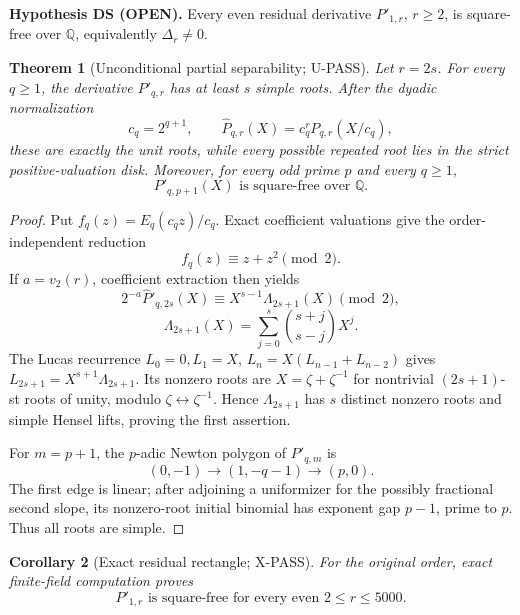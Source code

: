 \documentclass[11pt]{article}
\theoremstyle{keio}
\newtheorem{theorem}{Theorem}[section]
\newtheorem{corollary}[theorem]{Corollary}
\theoremstyle{definition}
\theoremstyle{remark}
\newcommand{\Q}{\mathbb Q}
\newcommand{\UPASS}{\textcolor{keiogreen}{\textsf{U-PASS}}}
\newcommand{\XPASS}{\textcolor{keioxblue}{\textsf{X-PASS}}}
\newcommand{\OPEN}{\textcolor{keioopen}{\textsf{OPEN}}}
\begin{document}
\begin{notebox}
\textbf{Hypothesis DS (\OPEN).} Every even residual derivative
$P'_{1,r}$, $r\ge2$, is square-free over $\Q$, equivalently
$\Delta_r\ne0$.
\end{notebox}

\begin{theorem}[Unconditional partial separability; \UPASS]\label{thm:partial-sep}
Let $r=2s$. For every $q\ge1$, the derivative $P'_{q,r}$ has at least
$s$ simple roots. After the dyadic normalization
\[
c_q=2^{q+1},\qquad
\widehat P_{q,r}(X)=c_q^rP_{q,r}(X/c_q),
\]
these are exactly the unit roots, while every possible repeated root lies
in the strict positive-valuation disk. Moreover, for every odd prime $p$
and every $q\ge1$,
\begin{equation}
\boxed{P'_{q,p+1}(X)\text{ is square-free over }\Q.}
\label{eq:prime-successor}
\end{equation}
\end{theorem}

\begin{proof}
Put $f_q(z)=E_q(c_qz)/c_q$. Exact coefficient valuations give the
order-independent reduction
\[
f_q(z)\equiv z+z^2\pmod2.
\]
If $a=v_2(r)$, coefficient extraction then yields
\begin{equation}
2^{-a}\widehat P'_{q,2s}(X)\equiv
X^{s-1}\Lambda_{2s+1}(X)\pmod2,
\label{eq:lambda-reduction}
\end{equation}
\begin{equation}
\Lambda_{2s+1}(X)=
\sum_{j=0}^s\binom{s+j}{s-j}X^j.
\label{eq:lambda}
\end{equation}
The Lucas recurrence $L_0=0,L_1=X$,
$L_n=X(L_{n-1}+L_{n-2})$ gives
$L_{2s+1}=X^{s+1}\Lambda_{2s+1}$. Its nonzero roots are
$X=\zeta+\zeta^{-1}$ for nontrivial $(2s+1)$-st roots of unity, modulo
$\zeta\leftrightarrow\zeta^{-1}$. Hence $\Lambda_{2s+1}$ has $s$
distinct nonzero roots and simple Hensel lifts, proving the first assertion.

For $m=p+1$, the $p$-adic Newton polygon of $P'_{q,m}$ is
\begin{equation}
(0,-1)\longrightarrow(1,-q-1)\longrightarrow(p,0).
\label{eq:prime-successor-NP}
\end{equation}
The first edge is linear; after adjoining a uniformizer for the possibly
fractional second slope, its nonzero-root initial binomial has exponent gap
$p-1$, prime to $p$. Thus all roots are simple.
\end{proof}

\begin{corollary}[Exact residual rectangle; \XPASS]\label{cor:residual-5000}
For the original order, exact finite-field computation proves
\begin{equation}
\boxed{P'_{1,r}\text{ is square-free for every even }2\le r\le5000.}
\label{eq:residual-5000}
\end{equation}
\end{corollary}
\end{document}
